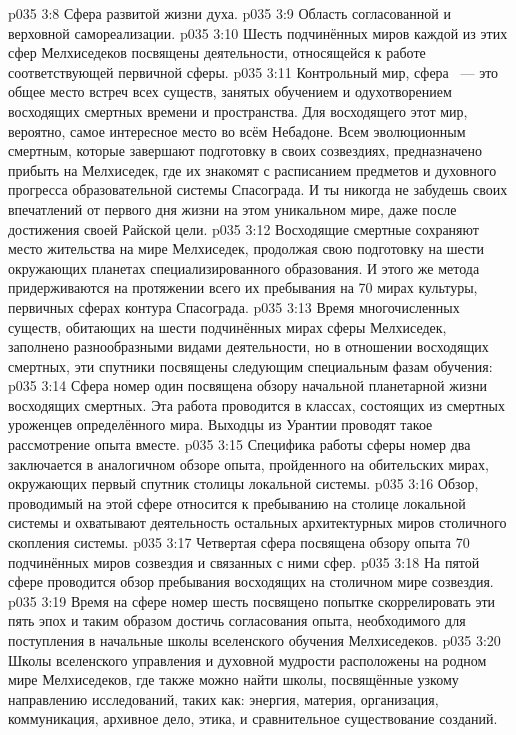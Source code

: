 \vs p035 3:8 Сфера развитой жизни духа.
\vs p035 3:9 Область согласованной и верховной самореализации.
\vs p035 3:10 \pc Шесть подчинённых миров каждой из этих сфер Мелхиседеков посвящены деятельности, относящейся к работе соответствующей первичной сферы.
\vs p035 3:11 \pc Контрольный мир, сфера ~--- это общее место встреч всех существ, занятых обучением и одухотворением восходящих смертных времени и пространства. Для восходящего этот мир, вероятно, самое интересное место во всём Небадоне. Всем эволюционным смертным, которые завершают подготовку в своих созвездиях, предназначено прибыть на Мелхиседек, где их знакомят с расписанием предметов и духовного прогресса образовательной системы Спасограда. И ты никогда не забудешь своих впечатлений от первого дня жизни на этом уникальном мире, даже после достижения своей Райской цели.
\vs p035 3:12 Восходящие смертные сохраняют место жительства на мире Мелхиседек, продолжая свою подготовку на шести окружающих планетах специализированного образования. И этого же метода придерживаются на протяжении всего их пребывания на 70 мирах культуры, первичных сферах контура Спасограда.
\vs p035 3:13 \pc Время многочисленных существ, обитающих на шести подчинённых мирах сферы Мелхиседек, заполнено разнообразными видами деятельности, но в отношении восходящих смертных, эти спутники посвящены следующим специальным фазам обучения:
\vs p035 3:14 Сфера номер один посвящена обзору начальной планетарной жизни восходящих смертных. Эта работа проводится в классах, состоящих из смертных уроженцев определённого мира. Выходцы из Урантии проводят такое рассмотрение опыта вместе.
\vs p035 3:15 Специфика работы сферы номер два заключается в аналогичном обзоре опыта, пройденного на обительских мирах, окружающих первый спутник столицы локальной системы.
\vs p035 3:16 Обзор, проводимый на этой сфере относится к пребыванию на столице локальной системы и охватывают деятельность остальных архитектурных миров столичного скопления системы.
\vs p035 3:17 Четвертая сфера посвящена обзору опыта 70 подчинённых миров созвездия и связанных с ними сфер.
\vs p035 3:18 На пятой сфере проводится обзор пребывания восходящих на столичном мире созвездия.
\vs p035 3:19 Время на сфере номер шесть посвящено попытке скоррелировать эти пять эпох и таким образом достичь согласования опыта, необходимого для поступления в начальные школы вселенского обучения Мелхиседеков.
\vs p035 3:20 \pc Школы вселенского управления и духовной мудрости расположены на родном мире Мелхиседеков, где также можно найти школы, посвящённые узкому направлению исследований, таких как: энергия, материя, организация, коммуникация, архивное дело, этика, и сравнительное существование созданий.

